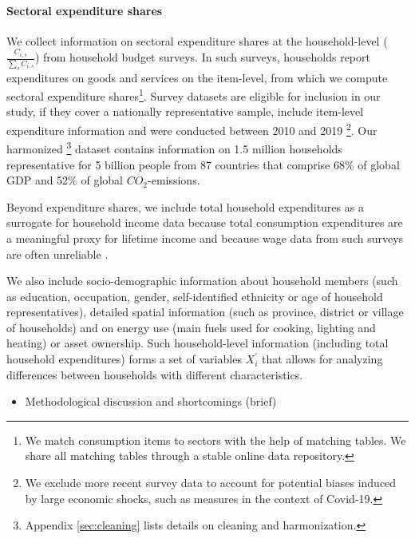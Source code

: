\documentclass[12pt, a4paper]{article}
\begin{document}
\paragraph{Sectoral expenditure shares} We collect information on sectoral expenditure shares at the household-level ($\frac{C_{i,s}}{\sum_{s}C_{i,s}}$) from household budget surveys. In such surveys, households report expenditures on goods and services on the item-level, from which we compute sectoral expenditure shares\footnote{We match consumption items to sectors with the help of matching tables. We share all matching tables through a stable online data repository.}.
Survey datasets are eligible for inclusion in our study, if they cover a nationally representative sample, include item-level expenditure information and were conducted between 2010 and 2019 \footnote{We exclude more recent survey data to account for potential biases induced by large economic shocks, such as measures in the context of Covid-19.}. Our harmonized \footnote{Appendix \ref{sec:cleaning} lists details on cleaning and harmonization.} dataset contains information on 1.5 million households representative for 5 billion people from 87 countries that comprise 68\% of global GDP and 52\% of global $CO_{2}$-emissions.

Beyond expenditure shares, we include total household expenditures as a surrogate for household income data because total consumption expenditures are a meaningful proxy for lifetime income \autocite{Poterba.1989; JamesM.Poterba.2016} and because wage data from such surveys are often unreliable \autocite{Blundell.1998}.

We also include socio-demographic information about household members (such as education, occupation, gender, self-identified ethnicity or age of household representatives), detailed spatial information (such as province, district or village of households) and on energy use (main fuels used for cooking, lighting and heating) or asset ownership. Such household-level information (including total household expenditures) forms a set of variables $X_{i}^{'}$ that allows for analyzing differences between households with different characteristics.

\begin{itemize}
    \item Methodological discussion and shortcomings (brief)
\end{itemize}

\end{document}
